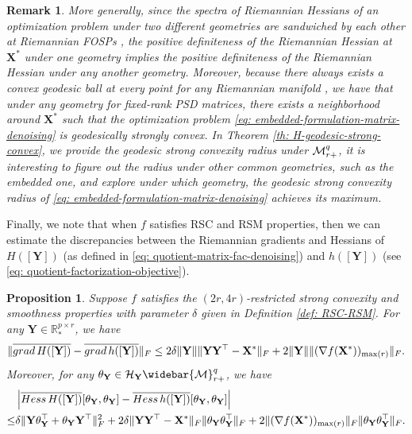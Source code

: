 \documentclass[11pt]{article}
\newtheorem{Remark}{Remark}
\newtheorem{Proposition}{Proposition}
\newcommand{\bbR}{\mathbb{R}}
\newcommand{\cH}{\mathcal{H}}
\newcommand{\0}{{\mathbf{0}}}
\newcommand{\1}{{\mathbf{1}}}
\newcommand{\X}{{\mathbf{X}}}
\newcommand{\Y}{{\mathbf{Y}}}
\newcommand{\cM}{{\cal M}}
\newcommand{\Hess}{{\rm Hess}}
\newcommand{\grad}{{\rm grad}}
\newcommand{\F}{{\rm F}}
\begin{document}
\begin{Remark}
	More generally, since the spectra of Riemannian Hessians of an optimization problem under two different geometries are sandwiched by each other at Riemannian FOSPs \cite{luo2021geometric}, the positive definiteness of the Riemannian Hessian at $\X^*$ under one geometry implies the positive definiteness of the Riemannian Hessian under any another geometry. Moreover, because there always exists a convex geodesic ball at every point for any Riemannian manifold \cite[Chapter 3.4]{do1992riemannian}, we have that under any geometry for fixed-rank PSD matrices, there exists a neighborhood around $\X^*$ such that the optimization problem \eqref{eq: embedded-formulation-matrix-denoising} is geodesically strongly convex. In Theorem \ref{th: H-geodesic-strong-convex}, we provide the geodesic strong convexity radius under $\cM_{r+}^q$, it is interesting to figure out the radius under other common geometries, such as the embedded one, and explore under which geometry, the geodesic strong convexity radius of \eqref{eq: embedded-formulation-matrix-denoising} achieves its maximum.
\end{Remark}

{Finally, we note that when $f$ satisfies RSC and RSM properties, then we can estimate the discrepancies between the Riemannian gradients and Hessians of $H([\Y])$ (as defined in \eqref{eq: quotient-matrix-fac-denoising}) and $h([\Y])$ (see \eqref{eq: quotient-factorization-objective}).
\begin{Proposition} \label{prop: hH-grad-hessian-connection}
	Suppose $f$ satisfies the $(2r,4r)$-restricted strong convexity and smoothness properties with parameter $\delta$ given in Definition \ref{def: RSC-RSM}. For any $\Y \in \bbR^{p \times r}_*$, we have
	\begin{equation} \label{ineq: gradient-connection}
		\| \overline{\grad\, H([\Y])} - \overline{\grad\, h([\Y])}  \|_\F \leq 2 \delta \|\Y\| \|\Y\Y^\top - \X^*\|_\F + 2 \|\Y\| \| ( \nabla f(\X^*) )_{\max(r)} \|_\F. 
	\end{equation}
	Moreover, for any $\theta_\Y \in \cH_\Y \widebar{\cM}_{r+}^{q}$, we have
	\begin{equation}
	\begin{split}
		&\left| \overline{\Hess\, H([\Y])}[\theta_\Y, \theta_\Y] - \overline{\Hess\, h([\Y])}[\theta_\Y, \theta_\Y]  \right|\\
		 \leq & \delta  \|\Y\theta_\Y^\top + \theta_\Y \Y^\top \|_\F^2 + 2 \delta \|\Y\Y^\top - \X^*\|_\F \|\theta_\Y \theta_\Y^\top\|_\F + 2 \| ( \nabla f(\X^*) )_{\max(r)} \|_\F \|\theta_\Y \theta_\Y^\top\|_\F.
	\end{split}
	\end{equation}
\end{Proposition}}
\end{document}
